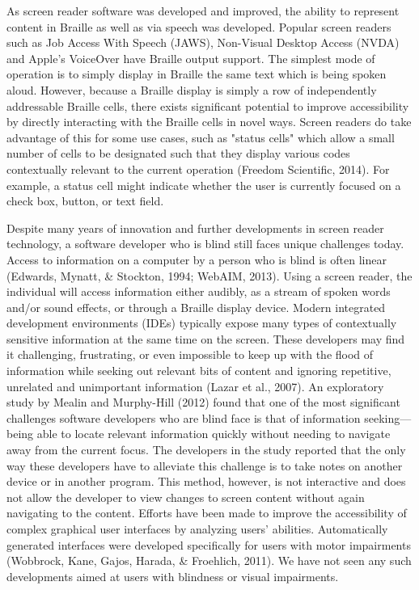 \documentclass[11.5pt]{sig-alternate} %
\begin{document}
\begin{large}
As screen reader software was developed and improved, the ability to represent content in Braille as well as via speech was developed. Popular screen readers such as Job Access With Speech (JAWS), Non-Visual Desktop Access (NVDA) and Apple’s VoiceOver have Braille output support. The simplest mode of operation is to simply display in Braille the same text which is being spoken aloud. However, because a Braille display is simply a row of independently addressable Braille cells, there exists significant potential to improve accessibility by directly interacting with the Braille cells in novel ways. Screen readers do take advantage of this for some use cases, such as "status cells" which allow a small number of cells to be designated such that they display various codes contextually relevant to the current operation (Freedom Scientific, 2014). For example, a status cell might indicate whether the user is currently focused on a check box, button, or text field.

Despite many years of innovation and further developments in screen reader technology, a software developer who is blind still faces unique challenges today. Access to information on a computer by a person who is blind is often linear (Edwards, Mynatt, \& Stockton, 1994; WebAIM, 2013). Using a screen reader, the individual will access information either audibly, as a stream of spoken words and/or sound effects, or through a Braille display device. Modern integrated development environments (IDEs) typically expose many types of contextually sensitive information at the same time on the screen. These developers may find it challenging, frustrating, or even impossible to keep up with the flood of information while seeking out relevant bits of content and ignoring repetitive, unrelated and unimportant information (Lazar et al., 2007). An exploratory study by Mealin and Murphy-Hill (2012) found that one of the most significant challenges software developers who are blind face is that of information seeking—being able to locate relevant information quickly without needing to navigate away from the current focus. The developers in the study reported that the only way these developers have to alleviate this challenge is to take notes on another device or in another program. This method, however, is not interactive and does not allow the developer to view changes to screen content without again navigating to the content. Efforts have been made to improve the accessibility of complex graphical user interfaces by analyzing users’ abilities. Automatically generated interfaces were developed specifically for users with motor impairments (Wobbrock, Kane, Gajos, Harada, \& Froehlich, 2011). We have not seen any such developments aimed at users with blindness or visual impairments.


\end{large}
\end{document}
